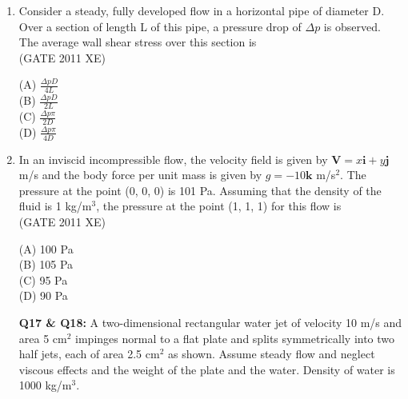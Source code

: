 \documentclass[journal,12pt,onecolumn]{IEEEtran}
\begin{document}
\begin{enumerate}
\begin{enumerate}
\begin{enumerate}
\hfill{(GATE 2011 XE)} \\
\begin{multicols}{4}
(A) 0.08 Pa\\
(B) 325 Pa\\
(C) 1115 Pa\\
(D) 9875 Pa
\end{multicols}

\item Consider a steady, fully developed flow in a horizontal pipe of diameter D. Over a section of length L of this pipe, a pressure drop of $\Delta p$ is observed. The average wall shear stress over this section is\\

\hfill{(GATE 2011 XE)} \\
\begin{multicols}{4}
(A) $\frac{\Delta p D}{4L}$\\
(B) $\frac{\Delta p D}{2L}$\\
(C) $\frac{\Delta p \pi}{2D}$\\
(D) $\frac{\Delta p \pi}{4D}$
\end{multicols}

\newpage

\item In an inviscid incompressible flow, the velocity field is given by $\mathbf{V} = x \mathbf{i} + y \mathbf{j}$ m/s and the body force per unit mass is given by $g = -10 \mathbf{k}$ m/s$^2$. The pressure at the point (0, 0, 0) is 101 Pa. Assuming that the density of the fluid is 1 kg/m$^3$, the pressure at the point (1, 1, 1) for this flow is\\

\hfill{(GATE 2011 XE)} \\
\begin{multicols}{4}
(A) 100 Pa\\
(B) 105 Pa\\
(C) 95 Pa\\
(D) 90 Pa
\end{multicols}


\item[\textbf{Q17 \& Q18:}]
A two-dimensional rectangular water jet of velocity 10 m/s and area 5 cm$^2$ impinges normal to a flat plate and splits symmetrically into two half jets, each of area 2.5 cm$^2$ as shown. Assume steady flow and neglect viscous effects and the weight of the plate and the water. Density of water is 1000 kg/m$^3$.\\


\end{enumerate}
\end{enumerate}
\end{enumerate}
\end{document}
